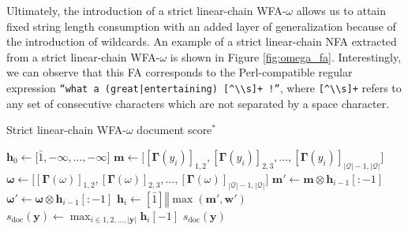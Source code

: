 Ultimately, the introduction of a strict linear-chain WFA-$\omega$ allows us to
attain fixed string length consumption with an added layer of generalization
because of the introduction of wildcards. An example of a strict linear-chain
NFA extracted from a strict linear-chain WFA-$\omega$ is shown in Figure
\ref{fig:omega_fa}. Interestingly, we can observe that this FA corresponds to
the Perl-compatible regular expression \texttt{``what a (great|entertaining)
  [\^{}\textbackslash\textbackslash s]+ !''}, where
\texttt{[\^{}\textbackslash\textbackslash s]+} refers to any set of consecutive
characters which are not separated by a space character.

\begin{algorithm}[t!]
  \small
  \caption{Strict linear-chain WFA-$\omega$ document score$^*$}
  \label{algo:lc_wfa_w_document_score}
  \begin{algorithmic}[1]
    \Statex
    \State $\bm{h}_0 \gets \big[\bar{1}, -\infty, \ldots, -\infty\big]$ 
     
    \State $\bm{m} \gets \big[[\bm{\Gamma}(y_i)]_{1,2}, [\bm{\Gamma}(y_i)]_{2,3}, \ldots,
    [\bm{\Gamma}(y_i)]_{|\mathcal{Q}|-1,|\mathcal{Q}|}\big]$ 
    \State $\bm{\omega} \gets \big[[\bm{\Gamma}(\omega)]_{1,2}, [\bm{\Gamma}(\omega)]_{2,3}, \ldots,
    [\bm{\Gamma}(\omega)]_{|\mathcal{Q}|-1,|\mathcal{Q}|}\big]$
    \State $\bm{m'} \gets \bm{m} \otimes \bm{h}_{i-1}[:-1]$ 
    \State $\bm{\omega'} \gets \bm{\omega} \otimes \bm{h}_{i-1}[:-1]$ 
    \State $\bm{h}_{i} \gets [\bar{1}] \mathbin\Vert \max(\bm{m'}, \bm{w'})$
    \EndFor
    \State $s_{\text{doc}}(\bm{y}) \gets  \max_{i \in 1,2,...,|\bm{y}|}
    \bm{h}_{i}[-1]$
    \State \Return $s_{\text{doc}}(\bm{y})$
    \EndFunction
  \end{algorithmic}
\end{algorithm}

